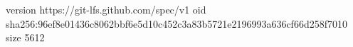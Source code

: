 version https://git-lfs.github.com/spec/v1
oid sha256:96ef8e01436c8062bbf6e5d10c452c3a83b5721e2196993a636cf66d258f7010
size 5612

